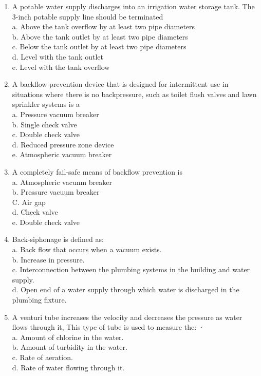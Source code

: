 \documentclass{article}
\begin{document}
\begin{enumerate}[1.]
\item A potable water supply discharges into an irrigation water storage tank. The 3-inch potable supply line should be terminated\\
a. Above the tank overflow by at least two pipe diameters\\
b. Above the tank outlet by at least two pipe diameters\\
c. Below the tank outlet by at least two pipe diameters\\
d. Level with the tank outlet\\
e. Level with the tank overflow\\

\item A backflow prevention device that is designed for intermittent use in situations where there is no backpressure, such as toilet flush valves and lawn sprinkler systems is a\\
a. Pressure vacuum breaker\\
b. Single check valve\\
c. Double check valve\\
d. Reduced pressure zone device\\
e. Atmospheric vacuum breaker\\

\item A completely fail-safe means of backflow prevention is\\
a. Atmospheric vacunm breaker\\
b. Pressure vacuum breaker\\
C. Air gap\\
d. Check valve\\
e. Double check valve\\

\item Back-siphonage is defined as:\\
a. Back flow that occurs when a vacuum exists.\\
b. Increase in pressure.\\
c. Interconnection between the plumbing systems in the building and water supply.\\
d. Open end of a water supply through which water is discharged in the plumbing fixture.\\

\item A venturi tube increases the velocity and decreases the pressure as water flows through it, This type of tube is used to measure the: ·\\
a. Amount of chlorine in the water.\\
b. Amount of turbidity in the water.\\
c. Rate of aeration.\\
d. Rate of water flowing through it.\\


\end{enumerate}
\end{document}
